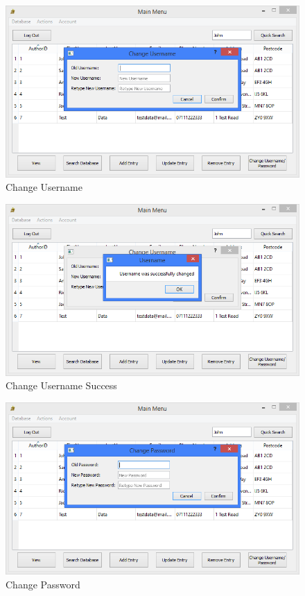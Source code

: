 \begin{figure}[H]
    \caption{Change Username} \label{fig:ChangeUsername}
    \includegraphics[width=\textwidth]{./Maintenance/UserInterface/ChangeUsername.png}
\end{figure}

\begin{figure}[H]
    \caption{Change Username Success} \label{fig:ChangeUsernameSuccess}
    \includegraphics[width=\textwidth]{./Maintenance/UserInterface/ChangeUsernameSuccess.png}
\end{figure}

\begin{figure}[H]
    \caption{Change Password} \label{fig:ChangePassword}
    \includegraphics[width=\textwidth]{./Maintenance/UserInterface/ChangePassword.png}
\end{figure}


